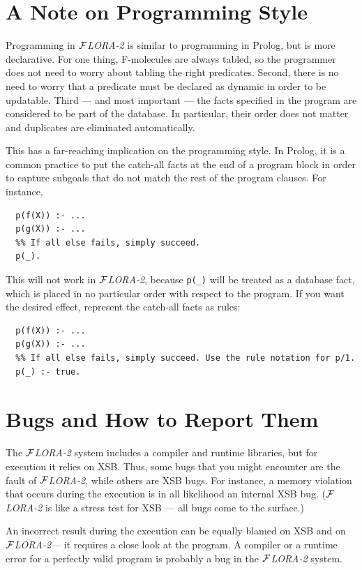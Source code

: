 \documentclass[11pt]{article}
\newcommand{\FLORA}{{\mbox{${\cal F}${\small\it LORA}\rm\emph{-2}}}\xspace}
\begin{document}
\section{A Note on Programming Style}

Programming in \FLORA is similar to programming in Prolog, but is more
declarative. For one thing, F-molecules are always tabled, so the
programmer does not need to worry about tabling the right predicates.
Second, there is no need to worry that a predicate must be declared as
dynamic in order to be updatable. Third --- and most important --- the facts 
specified in the program are considered to be part of the database. In
particular, their order does not matter and duplicates are eliminated
automatically. 

This has a far-reaching implication on the programming style.
In Prolog, it is a common practice to put the catch-all facts at the end of
a program block in order to capture subgoals that do not match the rest of
the program clauses. For instance, 
\begin{verbatim}
  p(f(X)) :- ...
  p(g(X)) :- ...
  %% If all else fails, simply succeed.
  p(_).
\end{verbatim}
This will not work in \FLORA, because {\tt p(\_)} will be treated as a
database fact, which is placed in no particular order with respect to the
program. If you want the desired effect, represent the catch-all facts as
rules: 
\begin{verbatim}
  p(f(X)) :- ...
  p(g(X)) :- ...
  %% If all else fails, simply succeed. Use the rule notation for p/1.
  p(_) :- true.
\end{verbatim}


\section{Bugs and How to Report Them}

The \FLORA system includes a compiler and runtime libraries, but for
execution it relies on XSB. Thus, some bugs that you might encounter are
the fault of \FLORA, while others are XSB bugs. For instance, a memory
violation that occurs during the execution is in all likelihood an internal
XSB bug. (\FLORA is like a stress test for XSB --- all bugs come to the
surface.)

An incorrect result during the execution can be equally blamed on XSB and
on \FLORA --- it requires a close look at the program. A compiler or
a runtime error for a perfectly valid program is probably a bug in the
\FLORA system.
\end{document}
